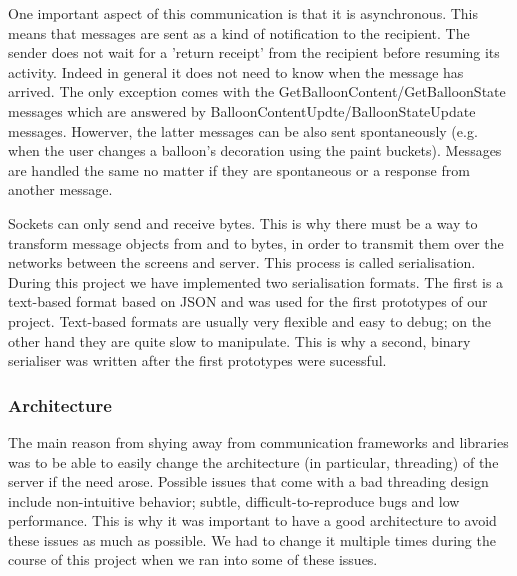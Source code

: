 One important aspect of this communication is that it is asynchronous. This 
means that messages are sent as a kind of notification to the recipient. The 
sender does not wait for a 'return receipt' from the recipient before resuming 
its activity. Indeed in general it does not need to know when the message has
arrived. The only exception comes with the GetBalloonContent/GetBalloonState 
messages which are answered by BalloonContentUpdte/BalloonStateUpdate messages.
Howerver, the latter messages can be also sent spontaneously (e.g. when the user 
changes a balloon's decoration using the paint buckets). Messages are handled 
the same no matter if they are spontaneous or a response from another message.

Sockets can only send and receive bytes. This is why there must be a way to
transform message objects from and to bytes, in order to transmit them over the
networks between the screens and server. This process is called serialisation. 
During this project we have implemented two serialisation formats. The first is
a text-based format based on JSON and was used for the first prototypes of our 
project. Text-based formats are usually very flexible and easy to debug; on
the other hand they are quite slow to manipulate. This is why a second, binary
serialiser was written after the first prototypes were sucessful.


\subsubsection{Architecture}

The main reason from shying away from communication frameworks and libraries was
to be able to easily change the architecture (in particular, threading) of the 
server if the need arose. Possible issues that come with a bad threading design 
include non-intuitive behavior; subtle, difficult-to-reproduce bugs and low 
performance. This is why it was important to have a good architecture to avoid 
these issues as much as possible. We had to change it multiple times during the 
course of this project when we ran into some of these issues.

